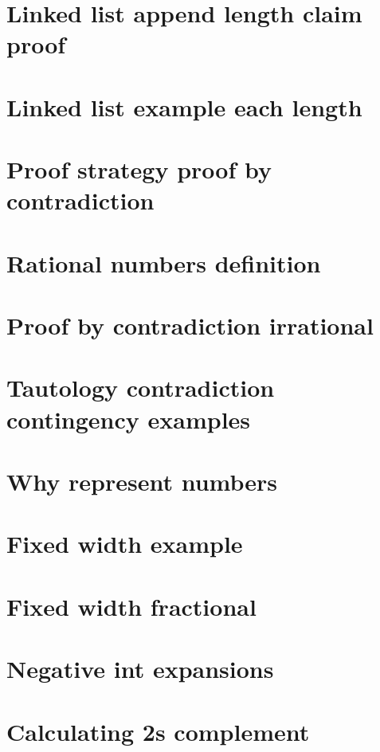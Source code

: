 \section*{Linked list append length claim proof}

\vfill
\section*{Linked list example each length}

\vfill
\section*{Proof strategy proof by contradiction}

\vfill
\section*{Rational numbers definition}

\vfill
\section*{Proof by contradiction irrational}

\vfill
\section*{Tautology contradiction contingency examples}

\vfill
\section*{Why represent numbers}

\vfill
\section*{Fixed width example}

\vfill
\section*{Fixed width fractional}

\vfill
\section*{Negative int expansions}

\vfill
\section*{Calculating 2s complement}

\vfill
